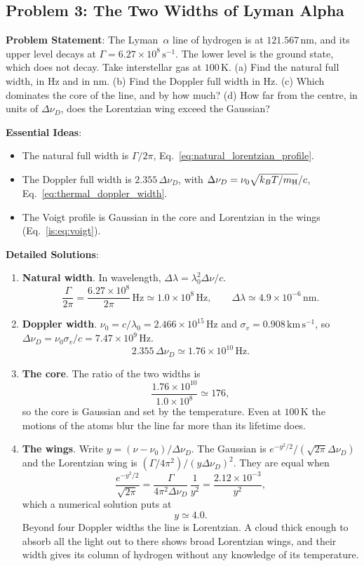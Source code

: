\subsection{Problem 3: The Two Widths of Lyman Alpha}
\label{is:prob:lya}

\textbf{Problem Statement}: The Lyman~$\alpha$ line of hydrogen is at $121.567\,\mathrm{nm}$, and its upper level decays at $\Gamma=6.27\times10^8\,\mathrm{s^{-1}}$. The lower level is the ground state, which does not decay. Take interstellar gas at $100\,\mathrm K$. (a) Find the natural full width, in Hz and in nm. (b) Find the Doppler full width in Hz. (c) Which dominates the core of the line, and by how much? (d) How far from the centre, in units of $\Delta\nu_D$, does the Lorentzian wing exceed the Gaussian?

\textbf{Essential Ideas}:
\begin{itemize}
	\item The natural full width is $\Gamma/2\pi$, Eq.~\eqref{eq:natural_lorentzian_profile}.
	\item The Doppler full width is $2.355\,\Delta\nu_D$, with $\Delta\nu_D=\nu_0\sqrt{k_BT/m_{\rm H}}/c$, Eq.~\eqref{eq:thermal_doppler_width}.
	\item The Voigt profile is Gaussian in the core and Lorentzian in the wings (Eq.~\eqref{is:eq:voigt}).
\end{itemize}

\textbf{Detailed Solutions}:
\begin{enumerate}[label=(\alph*)]
	\item \textbf{Natural width}. In wavelength, $\Delta\lambda=\lambda_0^2\Delta\nu/c$.
	\[
	\boxed{\frac{\Gamma}{2\pi}=\frac{6.27\times10^8}{2\pi}\,\mathrm{Hz}\simeq1.0\times10^8\,\mathrm{Hz},\qquad \Delta\lambda\simeq4.9\times10^{-6}\,\mathrm{nm}.}
	\]
	\item \textbf{Doppler width}. $\nu_0=c/\lambda_0=2.466\times10^{15}\,\mathrm{Hz}$ and $\sigma_v=0.908\,\mathrm{km\,s^{-1}}$, so $\Delta\nu_D=\nu_0\sigma_v/c=7.47\times10^9\,\mathrm{Hz}$.
	\[
	\boxed{2.355\,\Delta\nu_D\simeq1.76\times10^{10}\,\mathrm{Hz}.}
	\]
	\item \textbf{The core}. The ratio of the two widths is
	\[
	\boxed{\frac{1.76\times10^{10}}{1.0\times10^{8}}\simeq176,}
	\]
	so the core is Gaussian and set by the temperature. Even at $100\,\mathrm K$ the motions of the atoms blur the line far more than its lifetime does.
	\item \textbf{The wings}. Write $y=(\nu-\nu_0)/\Delta\nu_D$. The Gaussian is $e^{-y^2/2}/(\sqrt{2\pi}\Delta\nu_D)$ and the Lorentzian wing is $(\Gamma/4\pi^2)/(y\Delta\nu_D)^2$. They are equal when
	\[
	\frac{e^{-y^2/2}}{\sqrt{2\pi}}=\frac{\Gamma}{4\pi^2\Delta\nu_D}\,\frac{1}{y^2}=\frac{2.12\times10^{-3}}{y^2},
	\]
	which a numerical solution puts at
	\[
	\boxed{y\simeq4.0.}
	\]
	Beyond four Doppler widths the line is Lorentzian. A cloud thick enough to absorb all the light out to there shows broad Lorentzian wings, and their width gives its column of hydrogen without any knowledge of its temperature.
\end{enumerate}

